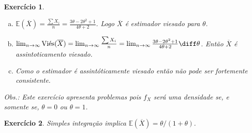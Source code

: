 \documentclass[letter,11pt]{article}
\newtheorem{exer}{Exercício}
\newcommand{\E}{\mathbb {E}}
\begin{document}
\begin{exer} \rm
\begin{enumerate}[a)]
\item $\E(\overline{X}) = \frac{\sum X_i}{n} = \frac{3\theta-2\theta^2+1}{4\theta+2}$.
Logo $\overline{X}$ é estimador viesado para $\theta$.

\item $\lim_{n \rightarrow \infty} \text{Viés}(\overline{X}) = \lim_{n \rightarrow \infty} \frac{\sum X_i}{n} = \lim_{n \rightarrow \infty} \frac{3\theta-2\theta^2+1}{4\theta+2} \diff \theta$.
Então $\overline{X}$ é assintoticamento viesado.

\item Como o estimador é assintóticamente viesado então não pode ser fortemente consistente.
\end{enumerate}


\noindent Obs.: Este exercício apresenta problemas pois $f_X$ será uma densidade
se, e somente se, $\theta=0$ ou $\theta=1$.
\end{exer}

\begin{exer} \rm
Simples integração implica $\E(\overline{X})=\theta/(1+\theta)$.
\end{exer}
\end{document}
